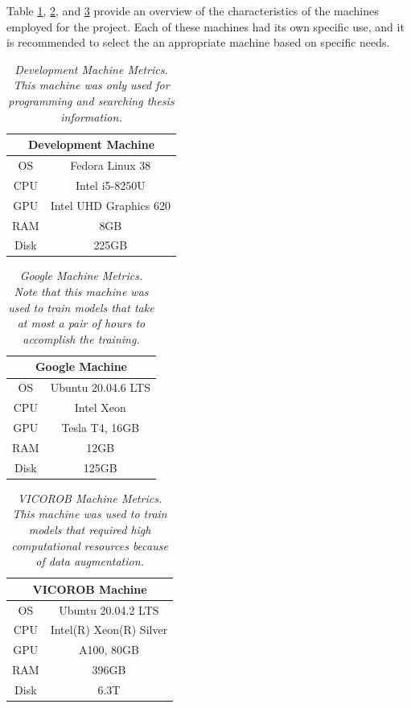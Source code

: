 Table \ref{table:dev-machine}, \ref{table:google-machine}, and \ref{table:vicorobot-machine} provide an overview of the characteristics of the machines employed for the project. Each of these machines had its own specific use, and it is recommended to select the an appropriate machine based on specific needs.

\begin{table}[H]
  \centering
  \begin{tabular}{cc}
    \toprule
    \multicolumn{2}{c}{\textbf{Development Machine}} \\
    \midrule
    OS & Fedora Linux 38 \\
    CPU & Intel i5-8250U \\
    GPU & Intel UHD Graphics 620 \\
    RAM & 8GB \\
    Disk & 225GB \\
    \bottomrule
  \end{tabular}
  \caption[Development Machine Metrics.]
  {\textit{Development Machine Metrics.
  This machine was only used for programming and searching thesis information.}}
  \label{table:dev-machine}
\end{table}


\begin{table}[H]
  \centering
  \begin{tabular}{cc}
    \toprule
    \multicolumn{2}{c}{\textbf{Google Machine}} \\
    \midrule
    OS & Ubuntu 20.04.6 LTS \\
    CPU & Intel Xeon \\
    GPU & Tesla T4, 16GB \\
    RAM & 12GB \\
    Disk & 125GB \\
    \bottomrule
  \end{tabular}
  \caption[Google Machine Metrics.]
  {\textit{Google Machine Metrics.
  Note that this machine was used to train models that take at most a pair of hours to accomplish the training.}}
  {\label{table:google-machine}}
\end{table}

\newpage

\begin{table}[H]
  \centering
  \begin{tabular}{cc}
    \toprule
    \multicolumn{2}{c}{\textbf{VICOROB Machine}} \\
    \midrule
    OS & Ubuntu 20.04.2 LTS \\
    CPU & Intel(R) Xeon(R) Silver \\
    GPU & A100, 80GB\\
    RAM & 396GB \\
    Disk & 6.3T \\
    \bottomrule
  \end{tabular}
  \caption[VICOROB Machine Metrics.]
  {\textit{VICOROB Machine Metrics.
  This machine was used to train models that required high computational resources because of data augmentation.}}
  {\label{table:vicorobot-machine}}
\end{table}

